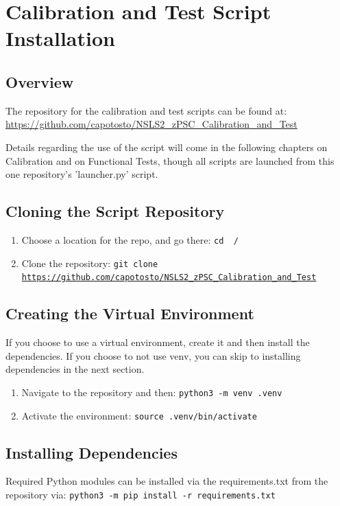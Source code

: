 
\chapter{Calibration and Test Script Installation}
\label{chap:Calibration and Test Script Installation}
\section{Overview}

The repository for the calibration and test scripts can be found at: \url{https://github.com/capotosto/NSLS2_zPSC_Calibration_and_Test}

Details regarding the use of the script will come in the following chapters on Calibration and on Functional Tests, though all scripts are launched from this one repository's 'launcher.py' script. 

\section{Cloning the Script Repository}
	\begin{enumerate}
		\item Choose a location for the repo, and go there: \texttt{cd ~/}
		\item Clone the repository: \texttt{git clone \url{https://github.com/capotosto/NSLS2_zPSC_Calibration_and_Test}}
	\end{enumerate}
	
\section{Creating the Virtual Environment}
If you choose to use a virtual environment, create it and then install the dependencies. If you choose to not use venv, you can skip to installing dependencies in the next section. 
	\begin{enumerate}
		\item Navigate to the repository and then: \texttt{python3 -m venv .venv}
		\item Activate the environment: \texttt{source .venv/bin/activate}
	\end{enumerate}

\section{Installing Dependencies}
Required Python modules can be installed via the requirements.txt from the repository via: \texttt{python3 -m pip install -r requirements.txt}

